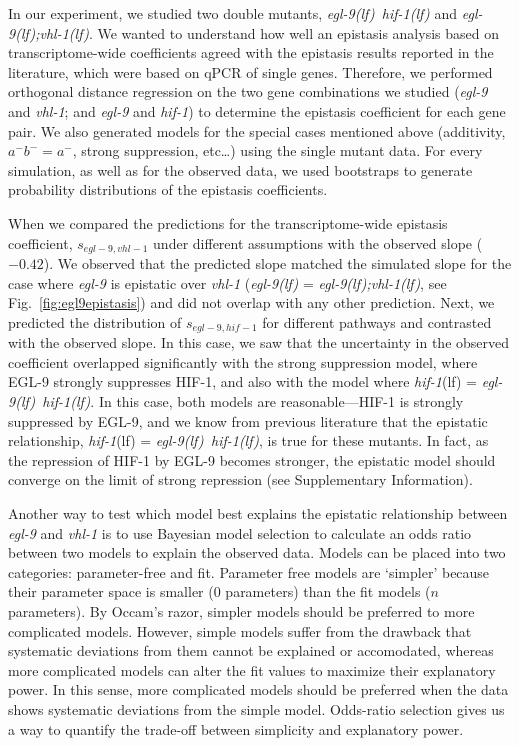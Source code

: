 \documentclass[10pt, onecolumn]{article}
\newcommand{\gene}[1]{\emph{#1}}
\newcommand{\egl}{\emph{\mbox{egl-9}(lf)}}
\newcommand{\eglvhl}{\emph{\mbox{egl-9(lf);vhl-1(lf)}}}
\newcommand{\eglhif}{\emph{\mbox{egl-9(lf)}~\mbox{hif-1(lf)}}}
\newcommand{\hif}{\emph{\mbox{hif-1}}(lf)}
\newcommand{\eglp}{EGL-9}
\newcommand{\hifp}{HIF-1}
\begin{document}
In our experiment, we studied two double mutants, \eglhif{} and \eglvhl{}.
We wanted to understand how well an epistasis analysis based on transcriptome-wide
coefficients agreed with the epistasis results reported in the literature, which
were based on qPCR of single genes. Therefore, we performed orthogonal distance
regression on the two gene combinations we studied (\gene{egl-9} and
\gene{vhl-1}; and \gene{egl-9} and \gene{hif-1}) to determine the epistasis
coefficient for each gene pair. We also generated models for the special cases
mentioned above (additivity, $a^-b^-=a^-$, strong suppression, etc\ldots) using
the single mutant data. For every simulation, as well as for the observed data,
we used bootstraps to generate probability distributions of the epistasis
coefficients.

When we compared the predictions for the transcriptome-wide epistasis coefficient,
$s_{egl-9,vhl-1}$ under different assumptions with the observed slope ($-0.42$). We
observed that the predicted slope matched the simulated slope for the case where
\gene{egl-9} is epistatic over \gene{vhl-1} (\egl{} = \eglvhl{}, see
Fig.~\ref{fig:egl9epistasis}) and did not overlap with any other prediction.
Next, we predicted the distribution of $s_{egl-9,hif-1}$ for different pathways
and contrasted with the observed slope. In this case, we saw that the uncertainty
in the observed coefficient overlapped significantly with the strong suppression
model, where \eglp{} strongly suppresses \hifp{}, and also with the model where
\hif{} = \eglhif{}. In this case, both models are reasonable---\hifp{} is strongly
suppressed by \eglp{}, and we know from previous literature that the epistatic
relationship, \hif{} = \eglhif{}, is true for these mutants. In fact, as the
repression of \hifp{} by \eglp{} becomes stronger, the epistatic model should converge
on the limit of strong repression (see Supplementary Information).

Another way to test which model best explains the epistatic relationship between
\gene{egl-9} and \gene{vhl-1} is to use Bayesian model selection to calculate
an odds ratio between two models to explain the observed data. Models can be placed
into two categories: parameter-free and fit. Parameter free models are `simpler'
because their parameter space is smaller (0 parameters) than the fit models ($n$
parameters). By Occam's razor, simpler models should be preferred to more
complicated models. However, simple models suffer from the drawback that
systematic deviations from them cannot be explained or accomodated, whereas more
complicated models can alter the fit values to maximize their explanatory power.
In this sense, more complicated models should be preferred when the data shows
systematic deviations from the simple model. Odds-ratio selection gives us a way
to quantify the trade-off between simplicity and explanatory power.
\end{document}
